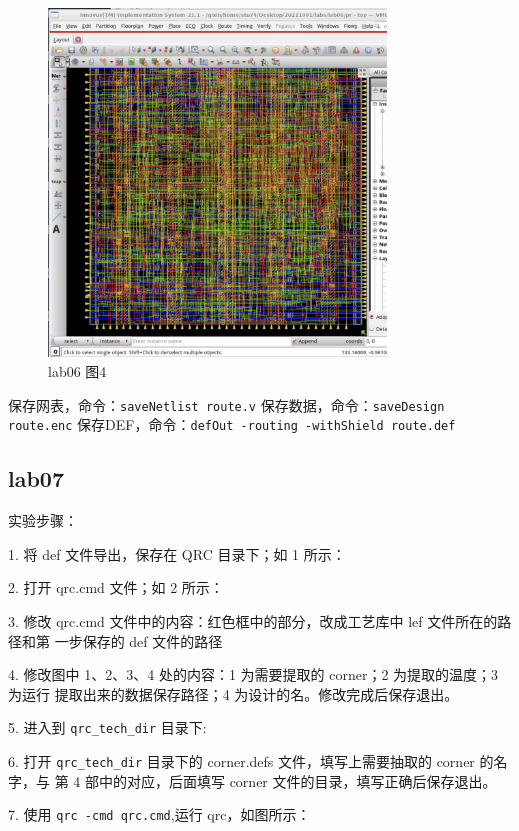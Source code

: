 \begin{figure}[H]
    \centering
    \includegraphics[width=0.8\textwidth]{images/lab06-04.png}
    \caption{lab06 图4}
\end{figure}

保存网表，命令：\texttt{saveNetlist route.v}
保存数据，命令：\texttt{saveDesign route.enc}
保存DEF，命令：\texttt{defOut -routing -withShield route.def}

\subsection{lab07}

实验步骤：

1. 将 def 文件导出，保存在 QRC 目录下；如 1 所示：

2. 打开 qrc.cmd 文件；如 2 所示：

3. 修改 qrc.cmd 文件中的内容：红色框中的部分，改成工艺库中 lef 文件所在的路径和第 一步保存的 def 文件的路径

4. 修改图中 1、2、3、4 处的内容：1 为需要提取的 corner；2 为提取的温度；3 为运行 提取出来的数据保存路径；4 为设计的名。修改完成后保存退出。

5. 进入到 \texttt{qrc\_tech\_dir} 目录下:

6. 打开 \texttt{qrc\_tech\_dir} 目录下的 corner.defs 文件，填写上需要抽取的 corner 的名字，与 第 4 部中的对应，后面填写 corner 文件的目录，填写正确后保存退出。

7. 使用 \texttt{qrc -cmd qrc.cmd},运行 qrc，如图所示：

